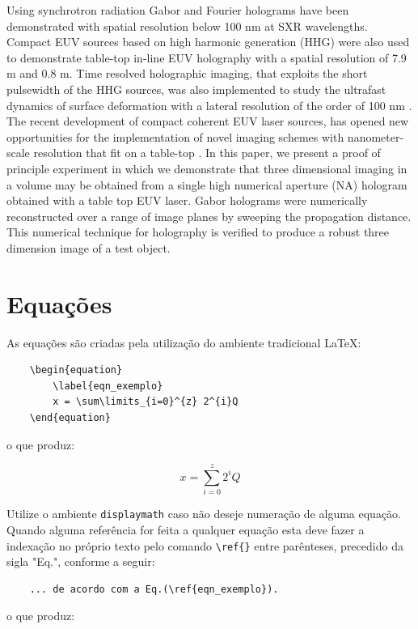 \documentclass[12pt,A4,A4pt]{article}
\begin{document}
Using synchrotron radiation Gabor and Fourier holograms have been demonstrated \cite{Mizuuchi2003}
 with spatial resolution below 100 nm at SXR wavelengths.  Compact EUV sources based on high harmonic generation (HHG) were also used to demonstrate table-top in-line EUV holography with a spatial resolution of 7.9 m  and 0.8 m.  Time resolved holographic imaging, that exploits the short pulsewidth of the HHG sources, was also implemented to study the ultrafast dynamics of surface deformation with a lateral resolution of the order of 100 nm \cite{Mizuuchi2005,Nakanishi2007}.  The recent development of compact coherent EUV laser sources,  has opened new opportunities for the implementation of novel imaging schemes with nanometer-scale resolution that fit on a table-top \cite{Mizuuchi2003,scht2000}. In this paper, we present a proof of principle experiment in which we demonstrate that three dimensional imaging in a volume may be obtained from a single high numerical  aperture (NA) hologram obtained with a table top EUV laser. Gabor holograms were numerically reconstructed over a range of image planes by sweeping the propagation distance. This numerical  technique for holography is verified to produce a robust three dimension image of a test object.  

\section{Equações}
As equações são criadas pela utilização do ambiente tradicional \LaTeX:

\begin{verbatim}
    \begin{equation}
        \label{eqn_exemplo}
        x = \sum\limits_{i=0}^{z} 2^{i}Q
    \end{equation}
\end{verbatim}
o que produz:

\begin{equation}
     \label{eqn_exemplo}
      x = \sum\limits_{i=0}^{z} 2^{i}Q
\end{equation}

Utilize o ambiente \verb|displaymath| caso não deseje numeração de alguma equação. Quando alguma referência for feita a qualquer equação esta deve fazer a indexação no próprio texto pelo comando \verb|\ref{}| entre parênteses, precedido da sigla "Eq.", conforme a seguir:

\begin{verbatim}
    ... de acordo com a Eq.(\ref{eqn_exemplo}).
\end{verbatim}
o que produz:
\end{document}
